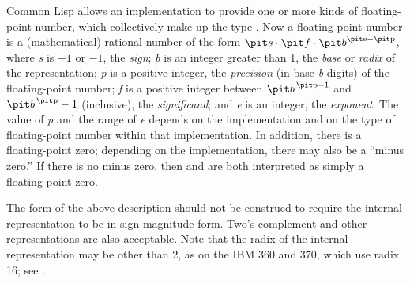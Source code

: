 Common Lisp allows an implementation to provide one or more kinds of
floating-point number, which collectively make up the type .
Now a floating-point number is a (mathematical)
rational number of the form
${\it s} \cdot {\it f} \cdot {\it b}^{\hbox{\scriptsize\it e}-\hbox{\scriptsize\it p}}$,
where {\it s} is $+1$ or $-1$, the {\it sign};
{\it b} is an integer greater than 1,
the {\it base} or {\it radix} of the representation;
{\it p} is a positive integer,
the {\it precision} (in base-{\it b} digits) of the floating-point number;
{\it f} is a positive integer between
${\it b}^{\,\hbox{\scriptsize\it p}-1}$ and ${\it b}^{\,\hbox{\scriptsize\it p}}-1$ (inclusive),
the {\it significand};
and {\it e} is an integer, the {\it exponent}.
The value of {\it p} and the range of {\it e}
depends on the implementation and on the type of floating-point number
within that implementation.
In addition, there is a floating-point zero;
depending on the implementation, there may also be a ``minus zero.''
If there is no minus zero, then  and  are
both interpreted as simply a floating-point zero.

\beforenoterule
\begin{implementation}
The form of the above description should not be construed
to require the internal representation to be in sign-magnitude form.
Two's-complement and other representations are also acceptable.  Note
that the radix of the internal representation may be other than 2, as on
the IBM 360 and 370, which use radix 16; see
.
\end{implementation}
\afternoterule

